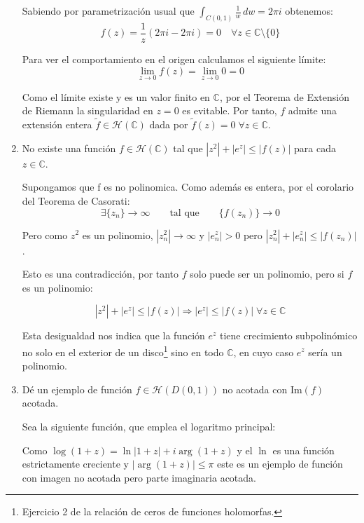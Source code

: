 \documentclass[12pt]{article}
\begin{document}
\begin{ejercicio}
\begin{enumerate}
                Sabiendo por parametrización usual que $\displaystyle \int_{C(0,1)} \frac{1}{w} \, dw = 2\pi i$ obtenemos:
                \[f(z) = \frac{1}{z} (2\pi i - 2\pi i) = 0 \quad \forall z \in \mathbb{C}\setminus\{0\}\]

                Para ver el comportamiento en el origen calculamos el siguiente límite:
                \[\lim_{z \to 0} f(z) = \lim_{z \to 0} 0 = 0\]

                Como el límite existe y es un valor finito en $\mathbb{C}$, por el Teorema de Extensión de Riemann la singularidad en $z=0$ es evitable.
                Por tanto, $f$ admite una extensión entera $\tilde{f} \in \mathcal{H}(\mathbb{C})$ dada por $\tilde{f}(z) = 0 \; \forall z \in \mathbb{C}$.


            \item No existe una función $f \in \mathcal{H}(\mathbb{C})$ tal que $|z^2| + |e^z| \le |f(z)|$ para cada $z \in \mathbb{C}$.
                
                \bigskip

                Supongamos que f es no polinomica. Como además es entera, por el corolario del Teorema de Casorati:
                \[ \exists \{z_n\} \rightarrow \infty\qquad \text{tal que} \qquad \{f(z_n)\} \rightarrow 0 \]

                Pero como $z^2$ es un polinomio, $|z_n^2| \rightarrow \infty$ y $|e^z_n| > 0$ pero $|z_n^2| + |e^z_n| \le |f(z_n)|$.

                Esto es una contradicción, por tanto $f$ solo puede ser un polinomio, pero si $f$ es un polinomio:

                \[|z^2| + |e^z| \leq |f(z)| \Rightarrow |e^z| \leq |f(z)| \; \forall z\in\mathbb{C}\]

                Esta desigualdad nos indica que la función $e^z$ tiene crecimiento subpolinómico no solo en el exterior de un disco\footnote{Ejercicio 2 de la relación de ceros de funciones holomorfas.} sino en todo $\mathbb{C}$, en cuyo caso $e^z$ sería un polinomio.
            \item Dé un ejemplo de función $f \in \mathcal{H}(D(0, 1))$ no acotada con $\text{Im}(f)$ acotada.
            
                \bigskip

                Sea la siguiente función, que emplea el logaritmo principal:
                \Func{f}{\mathbb{C}\setminus\mathopen{]}-\infty,-1\mathclose{]}}{\mathbb{C}}{z}{\log(1+z)}

                Como $\log(1+z) = \ln|1+z| + i\arg(1+z)$ y el $\ln$ es una función estrictamente creciente y $|\arg(1+z)| \leq \pi$ este es un ejemplo de función con imagen no acotada pero parte imaginaria acotada.
        \end{enumerate}
    \end{ejercicio}
\end{document}
